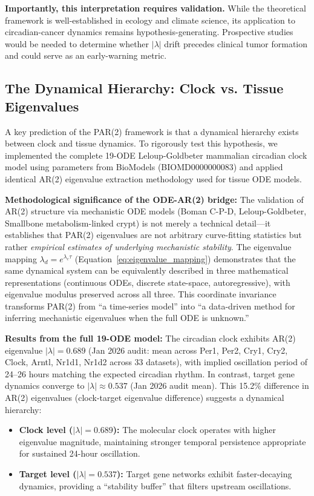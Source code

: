 \documentclass[11pt,a4paper]{article}
\begin{document}
\textbf{Importantly, this interpretation requires validation.} While the theoretical framework is well-established in ecology and climate science, its application to circadian-cancer dynamics remains hypothesis-generating. Prospective studies would be needed to determine whether $|\lambda|$ drift precedes clinical tumor formation and could serve as an early-warning metric.

\subsection{The Dynamical Hierarchy: Clock vs. Tissue Eigenvalues}

A key prediction of the PAR(2) framework is that a dynamical hierarchy exists between clock and tissue dynamics. To rigorously test this hypothesis, we implemented the complete 19-ODE Leloup-Goldbeter mammalian circadian clock model \citep{leloup2003pnas} using parameters from BioModels (BIOMD0000000083) and applied identical AR(2) eigenvalue extraction methodology used for tissue ODE models.

\textbf{Methodological significance of the ODE-AR(2) bridge:} The validation of AR(2) structure via mechanistic ODE models (Boman C-P-D, Leloup-Goldbeter, Smallbone metabolism-linked crypt) is not merely a technical detail---it establishes that PAR(2) eigenvalues are not arbitrary curve-fitting statistics but rather \textit{empirical estimates of underlying mechanistic stability}. The eigenvalue mapping $\lambda_d = e^{\lambda_c \tau}$ (Equation~\ref{eq:eigenvalue_mapping}) demonstrates that the same dynamical system can be equivalently described in three mathematical representations (continuous ODEs, discrete state-space, autoregressive), with eigenvalue modulus preserved across all three. This coordinate invariance transforms PAR(2) from ``a time-series model'' into ``a data-driven method for inferring mechanistic eigenvalues when the full ODE is unknown.''

\textbf{Results from the full 19-ODE model:} The circadian clock exhibits AR(2) eigenvalue $|\lambda| = 0.689$ (Jan 2026 audit: mean across Per1, Per2, Cry1, Cry2, Clock, Arntl, Nr1d1, Nr1d2 across 33 datasets), with implied oscillation period of 24--26 hours matching the expected circadian rhythm. In contrast, target gene dynamics converge to $|\lambda| \approx 0.537$ (Jan 2026 audit mean). This 15.2\% difference in AR(2) eigenvalues (clock-target eigenvalue difference) suggests a dynamical hierarchy:

\begin{itemize}
    \item \textbf{Clock level ($|\lambda| = 0.689$):} The molecular clock operates with higher eigenvalue magnitude, maintaining stronger temporal persistence appropriate for sustained 24-hour oscillation.
    \item \textbf{Target level ($|\lambda| = 0.537$):} Target gene networks exhibit faster-decaying dynamics, providing a ``stability buffer'' that filters upstream oscillations.
\end{itemize}
\end{document}
